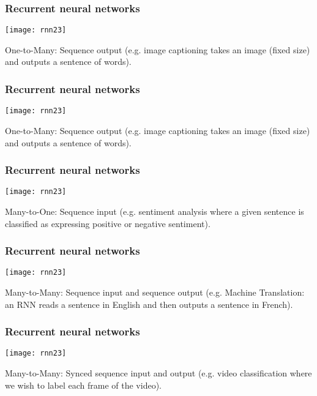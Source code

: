 \begin{frame}[fragile] \frametitle{Recurrent neural networks}
\begin{center}
\texttt{[image: rnn23]}
\end{center}
One-to-Many: Sequence output (e.g. image captioning takes an image (fixed size) and outputs a sentence of words).
\end{frame}

\begin{frame}[fragile] \frametitle{Recurrent neural networks}
\begin{center}
\texttt{[image: rnn23]}
\end{center}
One-to-Many: Sequence output (e.g. image captioning takes an image (fixed size) and outputs a sentence of words).
\end{frame}

\begin{frame}[fragile] \frametitle{Recurrent neural networks}
\begin{center}
\texttt{[image: rnn23]}
\end{center}
Many-to-One: Sequence input (e.g. sentiment analysis where a given sentence is classified as expressing positive or negative sentiment).
\end{frame}

\begin{frame}[fragile] \frametitle{Recurrent neural networks}
\begin{center}
\texttt{[image: rnn23]}
\end{center}
Many-to-Many: Sequence input and sequence output (e.g. Machine Translation: an RNN reads a sentence in English and then outputs a sentence in French).
\end{frame}

\begin{frame}[fragile] \frametitle{Recurrent neural networks}
\begin{center}
\texttt{[image: rnn23]}
\end{center}
Many-to-Many: Synced sequence input and output (e.g. video classification where we wish to label each frame of the video).
\end{frame}

